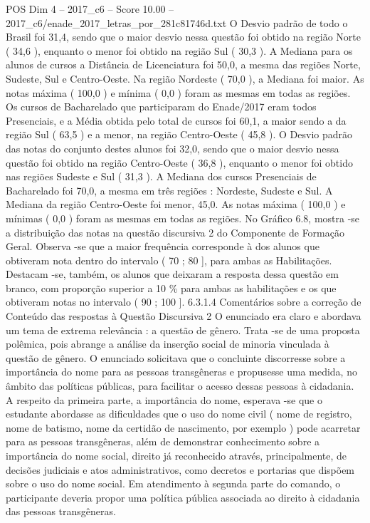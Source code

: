 \begin{textsample}{POS Dim 4 – 2017\_c6 – Score 10.00 – 2017\_c6/enade\_2017\_letras\_por\_281c81746d.txt}
O Desvio padrão de todo o Brasil foi 31,4, sendo que o maior desvio nessa questão foi obtido na região Norte ( 34,6 ), enquanto o menor foi obtido na região Sul ( 30,3 ).
A Mediana para os alunos de cursos a Distância de Licenciatura foi 50,0, a mesma das regiões Norte, Sudeste, Sul e Centro-Oeste.
Na região Nordeste ( 70,0 ), a Mediana foi maior.
As notas máxima ( 100,0 ) e mínima ( 0,0 ) foram as mesmas em todas as regiões.
Os cursos de Bacharelado que participaram do Enade/2017 eram todos Presenciais, e a Média obtida pelo total de cursos foi 60,1, a maior sendo a da região Sul ( 63,5 ) e a menor, na região Centro-Oeste ( 45,8 ).
O Desvio padrão das notas do conjunto destes alunos foi 32,0, sendo que o maior desvio nessa questão foi obtido na região Centro-Oeste ( 36,8 ), enquanto o menor foi obtido nas regiões Sudeste e Sul ( 31,3 ).
A Mediana dos cursos Presenciais de Bacharelado foi 70,0, a mesma em três regiões : Nordeste, Sudeste e Sul.
A Mediana da região Centro-Oeste foi menor, 45,0.
As notas máxima ( 100,0 ) e mínimas ( 0,0 ) foram as mesmas em todas as regiões.
No Gráfico 6.8, mostra -se a distribuição das notas na questão discursiva 2 do Componente de Formação Geral.
Observa -se que a maior frequência corresponde à dos alunos que obtiveram nota dentro do intervalo ( 70 ; 80 ], para ambas as Habilitações.
Destacam -se, também, os alunos que deixaram a resposta dessa questão em branco, com proporção superior a 10 \% para ambas as habilitações e os que obtiveram notas no intervalo ( 90 ; 100 ]. 6.3.1.4 Comentários sobre a correção de Conteúdo das respostas à Questão Discursiva 2 O enunciado era claro e abordava um tema de extrema relevância : a questão de gênero.
Trata -se de uma proposta polêmica, pois abrange a análise da inserção social de minoria vinculada à questão de gênero.
O enunciado solicitava que o concluinte discorresse sobre a importância do nome para as pessoas transgêneras e propusesse uma medida, no âmbito das políticas públicas, para facilitar o acesso dessas pessoas à cidadania.
A respeito da primeira parte, a importância do nome, esperava -se que o estudante abordasse as dificuldades que o uso do nome civil ( nome de registro, nome de batismo, nome da certidão de nascimento, por exemplo ) pode acarretar para as pessoas transgêneras, além de demonstrar conhecimento sobre a importância do nome social, direito já reconhecido através, principalmente, de decisões judiciais e atos administrativos, como decretos e portarias que dispõem sobre o uso do nome social.
Em atendimento à segunda parte do comando, o participante deveria propor uma política pública associada ao direito à cidadania das pessoas transgêneras.

\end{textsample}
